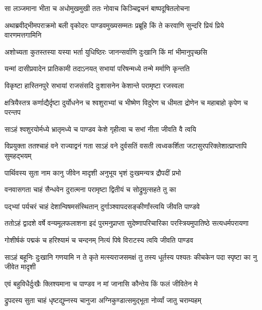 
\twolineshloka
{सा लञ्जमाना भीता च अधोमुखमुखी ततः}
{नोवाच किञ्चिद्वचनं बाष्पदूषितलोचना}


\twolineshloka
{अथाब्रवीद्भीमपराक्रमो बली वृकोदरः पाण्डवमुख्यसम्मतः}
{प्रब्रूहि किं ते करवाणि सुन्दरि प्रियं प्रिये वारणमत्तगामिनि}




\twolineshloka
{अशोच्यता कुतस्तस्या यस्या भर्ता युधिष्ठिरः}
{जानन्सर्वाणि दुःखानि किं मां भीमानुपृच्छसि}


\twolineshloka
{यन्मां दासीप्रवादेन प्रातिकामी तदाऽनयत्}
{सभायां परिषन्मध्ये तन्मे मर्माणि कृन्तति}


\twolineshloka
{विकृष्टा हास्तिनपुरे सभायां राजसंसदि}
{दुःशासनेन केशान्ते परामृष्टा रजस्वला}


\threelineshloka
{क्षत्रियैस्तत्र कर्णाद्यैर्दृष्टा दुर्योधनेन च}
{श्वशुराभ्यां च भीष्मेण विदुरेण च धीमता}
{द्रोणेन च महाबाहो कृपेण च परन्तप}


\twolineshloka
{साऽहं श्वशुरयोर्मध्ये भ्रातृमध्ये च पाण्डव}
{केशे गृहीत्वा च सभां नीता जीवति वै त्वयि}


\threelineshloka
{विप्रयुक्ता ततश्चाहं वने राज्याद्वनं गता}
{साऽहं वने दुर्वसतिं वसती त्वध्वकर्शिता}
{जटासुरपरिक्लेशात्प्राप्तापि सुमहद्भयम्}


\twolineshloka
{पार्थिवस्य सुता नाम कानु जीवेन मादृशी}
{अनुभूय भृशं दुःखमन्यत्र द्रौपदीं प्रभो}


\twolineshloka
{वनवासगता चाहं सैन्धवेन दुरात्मना}
{परामृष्टा द्वितीयं च सोद्रुमुत्सहते तु का}


\twolineshloka
{पद्भ्यां पर्यचरं चाहं देशान्विषमसंस्थितान्}
{दुर्गाञ्श्वापदसङ्कीर्णांस्त्वयि जीवति पाण्डवे}


\threelineshloka
{ततोऽहं द्वादशे वर्षे वन्यमूलफलाशना}
{इदं पुरमनुप्राप्ता सुदेष्णापरिचारिका}
{परस्त्रियमुपातिष्ठे सत्यधर्मपरायणा}


\twolineshloka
{गोशीर्षकं पद्मकं च हरिश्यामं च चन्दनम्}
{नित्यं पिषे विराटस्य त्वयि जीवति पाण्डव}


\onelineshloka
{साऽहं बहूनिः दुःखानि गणयामि न ते कृते}
\twolineshloka
{मत्स्यराजसमक्षं तु तस्य धूर्तस्य पश्यतः}
{कीचकेन पदा स्पृष्टा का नु जीवेत मादृशी}


\twolineshloka
{एवं बहुविधैर्दुःखैः क्लिश्यमाना च पाण्डव}
{न मां जानासि कौन्तेय किं फलं जीवितेन मे}


\twolineshloka
{द्रुपदस्य सुता चाहं धृष्टद्युम्नस्य चानुजा}
{अग्निकुण्डात्समुद्भूता नोर्व्यां जातु चराम्यहम्}


